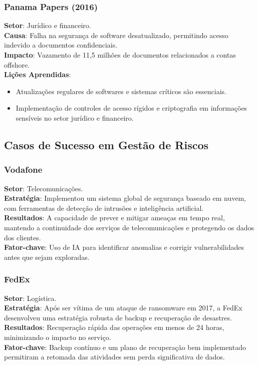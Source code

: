 \documentclass[12pt,oneside,a4paper,article]{abntex2}
\begin{document}
\subsubsection{Panama Papers (2016)}
\textbf{Setor}: Jurídico e financeiro. \\
\textbf{Causa}: Falha na segurança de software desatualizado, permitindo acesso indevido a documentos confidenciais. \\
\textbf{Impacto}: Vazamento de 11,5 milhões de documentos relacionados a contas offshore. \\
\textbf{Lições Aprendidas}: 
\begin{itemize}
    \item Atualizações regulares de softwares e sistemas críticos são essenciais.
    \item Implementação de controles de acesso rígidos e criptografia em informações sensíveis no setor jurídico e financeiro.
\end{itemize}



\subsection{Casos de Sucesso em Gestão de Riscos}


\subsubsection{Vodafone}
\textbf{Setor}: Telecomunicações. \\
\textbf{Estratégia}: Implementou um sistema global de segurança baseado em nuvem, com ferramentas de detecção de intrusões e inteligência artificial. \\
\textbf{Resultados}: A capacidade de prever e mitigar ameaças em tempo real, mantendo a continuidade dos serviços de telecomunicações e protegendo os dados dos clientes. \\
\textbf{Fator-chave}: Uso de IA para identificar anomalias e corrigir vulnerabilidades antes que sejam exploradas.


\subsubsection{FedEx}
\textbf{Setor}: Logística. \\
\textbf{Estratégia}: Após ser vítima de um ataque de ransomware em 2017, a FedEx desenvolveu uma estratégia robusta de backup e recuperação de desastres. \\
\textbf{Resultados}: Recuperação rápida das operações em menos de 24 horas, minimizando o impacto no serviço. \\
\textbf{Fator-chave}: Backup contínuo e um plano de recuperação bem implementado permitiram a retomada das atividades sem perda significativa de dados.
\end{document}

